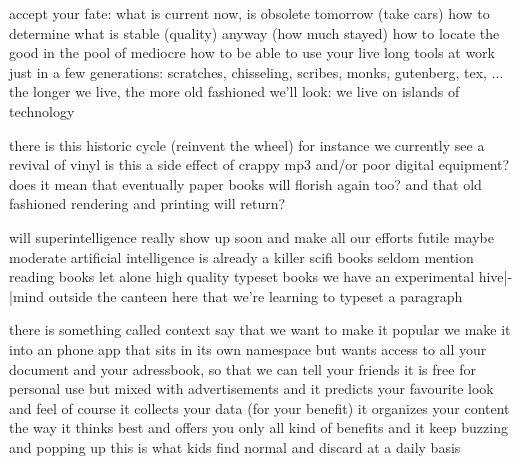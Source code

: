 
\startsection[title={future}]
    \startitemize
    \startitem accept your fate: what is current now, is obsolete tomorrow (take cars) \stopitem
    \startitem how to determine what is stable (quality) anyway (how much stayed) \stopitem
    \startitem how to locate the good in the pool of mediocre \stopitem
    \startitem how to be able to use your live long tools at work \stopitem
    \startitem just in a few generations: scratches, chisseling, scribes, monks, gutenberg, tex, ...  \stopitem
    \startitem the longer we live, the more old fashioned we'll look: we live on islands of technology \stopitem
    \stopitemize
\stopsection

\startsection[title={history cycles}]
    \startitemize
    \startitem there is this historic cycle (reinvent the wheel) \stopitem
    \startitem for instance we currently see a revival of vinyl \stopitem
    \startitem is this a side effect of crappy mp3 and/or poor digital equipment? \stopitem
    \startitem does it mean that eventually paper books will florish again too? \stopitem
    \startitem and that old fashioned rendering and printing will return? \stopitem
    \stopitemize
\stopsection

\startsection[title={consider the following}]
    \startitemize
    \startitem will superintelligence really show up soon and make all our efforts futile \stopitem
    \startitem maybe moderate artificial intelligence is already a killer \stopitem
    \startitem scifi books seldom mention reading books \stopitem
    \startitem let alone high quality typeset books \stopitem
    \startitem we have an experimental hive|-|mind outside the canteen here that we're learning to typeset a paragraph\stopitem
    \stopitemize
\stopsection

\startsection[title={think of this 1}]
    \startitemize
    \startitem there is something called context \stopitem
    \startitem say that we want to make it popular \stopitem
    \startitem we make it into an phone app \stopitem
    \startitem that sits in its own namespace \stopitem
    \startitem but wants access to all your document \stopitem
    \startitem and your adressbook, so that we can tell your friends \stopitem
    \startitem it is free for personal use \stopitem
    \startitem but mixed with advertisements \stopitem
    \startitem and it predicts your favourite look and feel \stopitem
    \startitem of course it collects your data (for your benefit) \stopitem
    \startitem it organizes your content the way it thinks best \stopitem
    \startitem and offers you only all kind of benefits \stopitem
    \startitem and it keep buzzing and popping up \stopitem
    \startitem this is what kids find normal \stopitem
    \startitem and discard at a daily basis \stopitem
    \stopitemize
\stopsection

